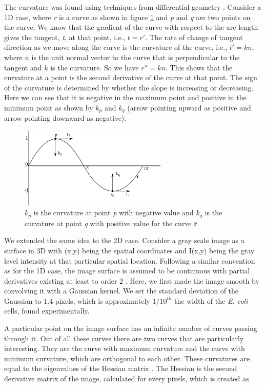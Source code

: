 \documentclass[journal]{IEEEtran}
\begin{document}
The curvature was found using techniques from differential geometry \cite  {willmoreintroduction1959}. Consider a 1D case, where \textit{r} is a curve as shown in figure \ref{fig:curve} and \textit{p} and \textit{q} are two points on the curve. We know that the gradient of the curve with respect to the arc length gives the tangent, \textit{t}, at that point, i.e., $t = r'$. The rate of change of tangent direction as we move along the curve is the curvature of the curve, i.e., $t' = kn$, where $n$ is the unit normal vector to the curve that is perpendicular to the tangent and $k$ is the curvature. So we have $r'' = kn$. This shows that the curvature at a point is the second derivative of the curve at that point.  The sign of the curvature is determined by whether the slope is increasing or decreasing. Here we can see that it is negative in the maximum point and positive in the minimum point as shown by $k_p$ and $k_q$ (arrow pointing upward as positive and arrow pointing downward as negative).
\begin{figure}[t ]
	\begin{center}
		\includegraphics[width=7cm]{fig1cuve.png}
		\caption{$k_p$ is the curvature at point \textit{p} with negative value and $k_q$ is the curvature at point \textit{q} with positive value for the curve \textbf{r}}
		\label{fig:curve}
	\end{center}    
\end{figure}
We extended the same idea to the 2D case. Consider a gray scale image as a surface in 3D with (x,y) being the spatial coordinates and I(x,y) being the gray level intensity at that particular spatial location. Following a similar convention as for the 1D case, the image surface is assumed to be continuous with partial derivatives existing at least to order $2$ \cite {willmoreintroduction1959}. Here, we first made the image smooth by convolving it with a Gaussian kernel. We set the standard deviation of the Gaussian to $1.4$ pixels, which is approximately $1/10^{th}$ the width of the \textit{E. coli} cells, found experimentally.


A particular point on the image surface has an infinite number of curves passing through it. Out of all these curves there are two curves that are particularly interesting. They are the curve with maximum curvature and the curve with minimum curvature, which are orthogonal to each other. These curvatures are equal to the eigenvalues of the Hessian matrix \cite {thorpeelementary1979}. The Hessian is the second derivative matrix of the image, calculated for every pixels, which is created as 
\end{document}
